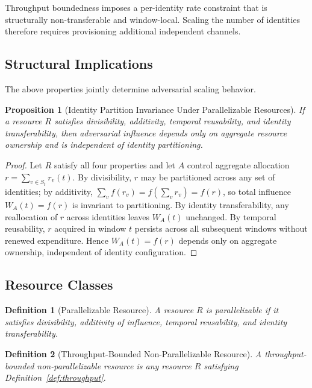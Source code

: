 \documentclass[journal]{IEEEtran}
\newtheorem{proposition}{Proposition}
\newtheorem{definition}{Definition}
\begin{document}
	Throughput boundedness imposes a per-identity rate constraint
	that is structurally non-transferable and window-local.
	Scaling the number of identities therefore requires
	provisioning additional independent channels.
	
	
	\subsection{Structural Implications}
	The above properties jointly determine adversarial scaling behavior.
	
	\begin{proposition}[Identity Partition Invariance Under Parallelizable Resources]
		If a resource $R$ satisfies divisibility, additivity,
		temporal reusability, and identity transferability,
		then adversarial influence depends only on aggregate
		resource ownership and is independent of identity partitioning.
	\end{proposition}
	
	\begin{proof}
		Let $R$ satisfy all four properties and let $A$ control
		aggregate allocation $r = \sum_{v \in S_t} r_v(t)$.
		By divisibility, $r$ may be partitioned across any set of
		identities; by additivity,
		$\sum_{v} f(r_v) = f(\sum_v r_v) = f(r)$,
		so total influence $W_A(t)=f(r)$ is invariant to partitioning.
		By identity transferability, any reallocation of $r$ across
		identities leaves $W_A(t)$ unchanged.
		By temporal reusability, $r$ acquired in window $t$ persists
		across all subsequent windows without renewed expenditure.
		Hence $W_A(t)=f(r)$ depends only on aggregate ownership,
		independent of identity configuration.
	\end{proof}
	
	\subsection{Resource Classes}
	
	\begin{definition}[Parallelizable Resource]
		A resource $R$ is \emph{parallelizable} if it satisfies
		divisibility, additivity of influence,
		temporal reusability, and identity transferability.
	\end{definition}
	
	\begin{definition}[Throughput-Bounded Non-Parallelizable Resource]
		A throughput-bounded non-parallelizable resource is any
		resource $R$ satisfying Definition~\ref{def:throughput}.
	\end{definition}
	
\end{document}
